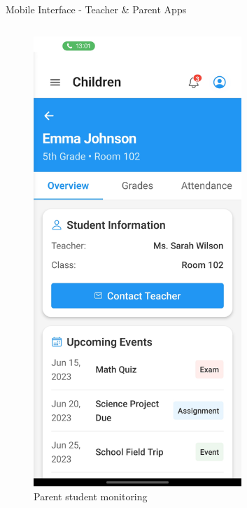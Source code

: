 \documentclass[aspectratio=169]{beamer}
\begin{document}
\begin{frame}{Mobile Interface - Teacher \& Parent Apps}
\begin{columns}
\begin{figure}
            \includegraphics[width=0.7\textwidth,height=0.6\textheight,keepaspectratio]{../pfe-pics/Mobile /Parent /Screenshot_20250610_133032_Expo Go.jpg}
            \caption{Parent student monitoring}
        \end{figure}
    \end{columns}
\end{frame}
\end{document}
